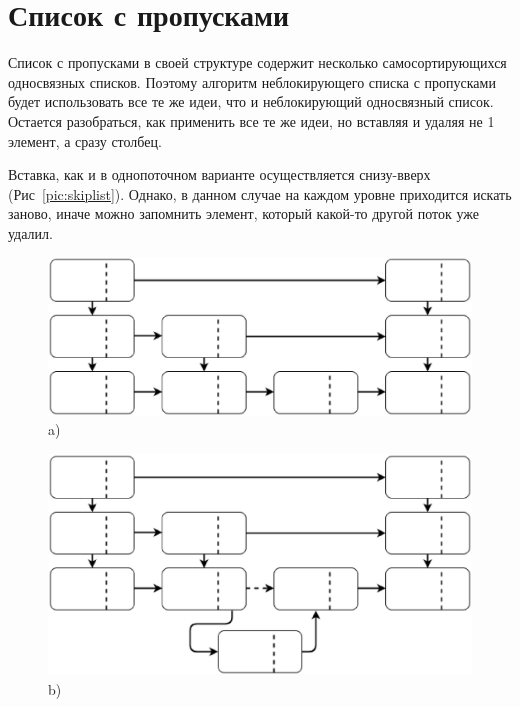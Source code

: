 \documentclass[12pt]{report}
\begin{document}
{		\section{Список с пропусками}
		\par Список с пропусками в своей структуре содержит несколько самосортирующихся односвязных списков. Поэтому алгоритм неблокирующего списка с пропусками будет использовать все те же идеи, что и неблокирующий односвязный список. Остается разобраться, как применить все те же идеи, но вставляя и удаляя не 1 элемент, а сразу столбец. 
		\par Вставка, как и в однопоточном варианте осуществляется снизу-вверх (Рис~\ref{pic:skiplist}). Однако, в данном случае на каждом уровне приходится искать заново, иначе можно запомнить элемент, который какой-то другой поток уже удалил.
		\begin{figure}[h!]
			\begin{minipage}[h]{0.45\linewidth}
				\center \includegraphics[width=1\linewidth]{12} a) \\
			\end{minipage}
			\hfill
			\begin{minipage}[h]{0.45\linewidth}
				\center \includegraphics[width=1\linewidth]{13} b) \\
			\end{minipage}
			\vfill
			\begin{minipage}[h]{0.60\linewidth}

\end{minipage}
\end{figure}}
\end{document}
